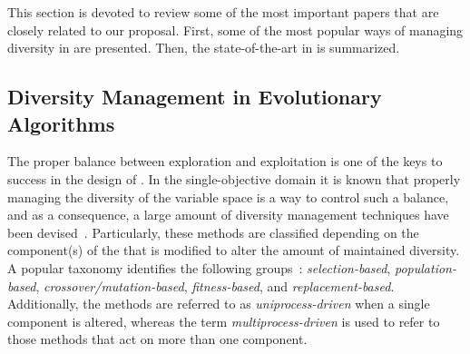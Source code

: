 This section is devoted to review some of the most important papers that are closely related to our proposal.
%
First, some of the most popular ways of managing diversity in \EAS{} are presented.
%
Then, the state-of-the-art in \MOEAS{} is summarized.

\subsection{Diversity Management in Evolutionary Algorithms}

The proper balance between exploration and exploitation is one of the keys to success in the design of \EAS{}.
%
In the single-objective domain it is known that properly managing the diversity of the variable space is a way to control such a balance,
and as a consequence, a large amount of diversity management techniques have been devised~\cite{Mohan:14}.
%
Particularly, these methods are classified depending on the component(s) of the \EA{} that is modified to alter the 
amount of maintained diversity.
%
A popular taxonomy identifies the following groups~\cite{Joel:Crepinsek}: \textit{selection-based}, \textit{population-based}, 
\textit{crossover/mutation-based}, \textit{fitness-based}, and \textit{replacement-based}.
%
Additionally, the methods are referred to as \textit{uniprocess-driven} when a single component is altered, whereas the term
\textit{multiprocess-driven} is used to refer to those methods that act on more than one component.

